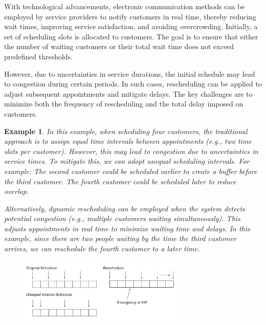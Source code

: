 \documentclass{article}
\newtheorem{example}{Example}
\begin{document}

With technological advancements, electronic communication methods can be employed by service providers to notify customers in real time, thereby reducing wait times, improving service satisfaction, and avoiding overcrowding. Initially, a set of scheduling slots is allocated to customers. The goal is to ensure that either the number of waiting customers or their total wait time does not exceed predefined thresholds.

However, due to uncertainties in service durations, the initial schedule may lead to congestion during certain periods. In such cases, rescheduling can be applied to adjust subsequent appointments and mitigate delays. The key challenges are to minimize both the frequency of rescheduling and the total delay imposed on customers.




\begin{example}
In this example, when scheduling four customers, the traditional approach is to assign equal time intervals between appointments (e.g., two time slots per customer). However, this may lead to congestion due to uncertainties in service times. To mitigate this, we can adopt unequal scheduling intervals. For example: The second customer could be scheduled earlier to create a buffer before the third customer. The fourth customer could be scheduled later to reduce overlap.

Alternatively, dynamic rescheduling can be employed when the system detects potential congestion (e.g., multiple customers waiting simultaneously). This adjusts appointments in real time to minimize waiting time and delays. In this example,  since there are two people waiting by the time the third customer arrives, we can reschedule the fourth customer to a later time.


\begin{figure}[ht]
    \centering
    \includegraphics[width=0.7\textwidth]{./Figures/ex2.png}
\end{figure}
\end{example}
\end{document}
